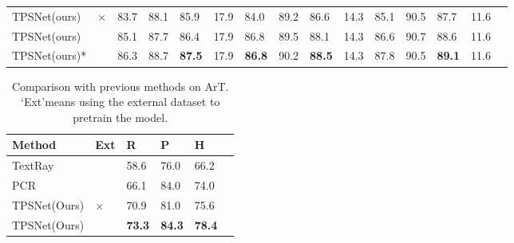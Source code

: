 \documentclass[sigconf]{acmart}
\begin{document}
\begin{table*}[ht]
\begin{tabularx}{\linewidth}{@{}lYYYYYYYYYYYYYX@{}}
			TPSNet(ours)         & $\times$                 & 83.7 & 88.1 & 85.9 &  17.9    & 84.0 & 89.2 & 86.6 &   14.3   & 85.1 & 90.5 & 87.7 &  11.6    \\
			TPSNet(ours)         & \checkmark                 & 85.1 & 87.7 & 86.4 &17.9      & 86.8 & 89.5 & 88.1 & 14.3     & 86.6 & 90.7 & 88.6 &   11.6   \\ 
			TPSNet(ours)*         & \checkmark           &  86.3    &  88.7    &    \textbf{87.5}  & 17.9 &   \textbf{86.8}   & 90.2     & \textbf{ 88.5}    & 14.3 & 87.8     &  90.5    &  \textbf{89.1}    & 11.6 \\ \bottomrule
		\end{tabularx}
		\label{table:sota}
		\vspace{-13px}
	\end{table*}
	
	\begin{table}[t]
		\setlength{\abovecaptionskip}{0cm}  \small
		\caption{Comparison with previous methods on ArT. ‘Ext’means using the external dataset to pretrain the model.}
		\centering
		\renewcommand{\arraystretch}{0.8}
		\begin{tabularx}{\linewidth}{@{}lYYYYX@{}}
			\toprule
			Method       & Ext  & R    & P    & H    \\ \midrule
			TextRay \cite{Wang2020textray}      & \checkmark & 58.6 & 76.0 & 66.2 \\
			PCR \cite{dai2021progressive}          & \checkmark & 66.1 & 84.0 & 74.0 \\ \midrule
			TPSNet(Ours) & $\times$ & 70.9 & 81.0 & 75.6 \\
			TPSNet(Ours) & \checkmark & \textbf{73.3} & \textbf{84.3} & \textbf{78.4} \\ \bottomrule
		\end{tabularx}
		\label{tab:art}
		\vspace{-10px}
	\end{table}
	
\end{document}

